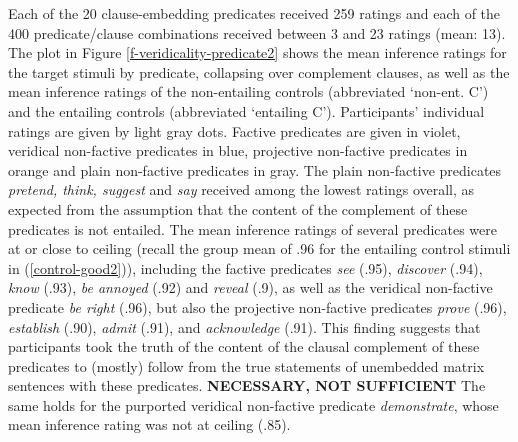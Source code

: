 \documentclass[11pt,fleqn]{article}
\newcommand{\6}{\mbox{$[\hspace*{-.6mm}[$}}
\newcommand{\9}{\mbox{$]\hspace*{-.6mm}]$}}
\begin{document}
Each of the 20 clause-embedding predicates received 259 ratings and each of the 400 predicate/clause combinations received between 3 and 23 ratings (mean: 13). The plot in Figure \ref{f-veridicality-predicate2} shows the mean inference ratings for the target stimuli by predicate, collapsing over complement clauses, as well as the mean inference ratings of the non-entailing controls (abbreviated `non-ent. C') and the entailing controls (abbreviated `entailing C'). Participants' individual ratings are given by light gray dots. Factive predicates are given in violet, veridical non-factive predicates in blue,  projective non-factive predicates in orange and plain non-factive predicates in gray. The plain non-factive predicates {\em pretend, think, suggest} and {\em say} received among the lowest ratings overall, as expected from the assumption that the content of the complement of these predicates is not entailed.  The mean inference ratings of several predicates were at or close to ceiling (recall the group mean of .96 for the entailing control stimuli in (\ref{control-good2})), including the factive predicates {\em see} (.95), {\em discover} (.94),  {\em know} (.93), {\em be annoyed} (.92) and {\em reveal} (.9), as well as the veridical non-factive predicate {\em be right} (.96), but also the projective non-factive predicates {\em prove} (.96),  {\em establish} (.90), {\em admit} (.91), and {\em acknowledge} (.91). This finding suggests that participants took the truth of the content of the clausal complement of these predicates to (mostly) follow from the true statements of unembedded matrix sentences with these predicates. {\bf NECESSARY, NOT SUFFICIENT} The same holds for the purported veridical non-factive predicate {\em demonstrate}, whose mean inference rating was not at ceiling (.85). 

\end{document}
